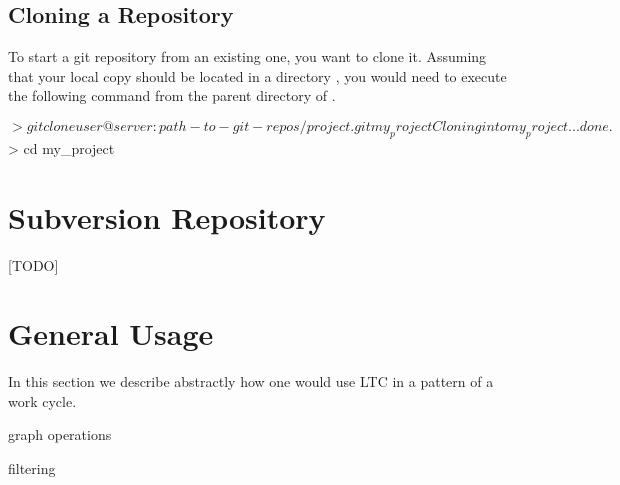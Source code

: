 \subsection{Cloning a Repository}

To start a git repository from an existing one, you want to clone it.  Assuming that your local copy should be located in a directory , you would need to execute the following command from the parent directory of .
\begin{CodeVerbatim}
$> git clone user@server:path-to-git-repos/project.git my_project
Cloning into my_project...
done.
$> cd my_project
\end{CodeVerbatim}

\section{Subversion Repository} \label{sec:svn-use}

[TODO]

\section{General Usage} \label{sec:general-use}

In this section we describe abstractly how one would use LTC in a pattern of a work cycle. %

graph operations

filtering



